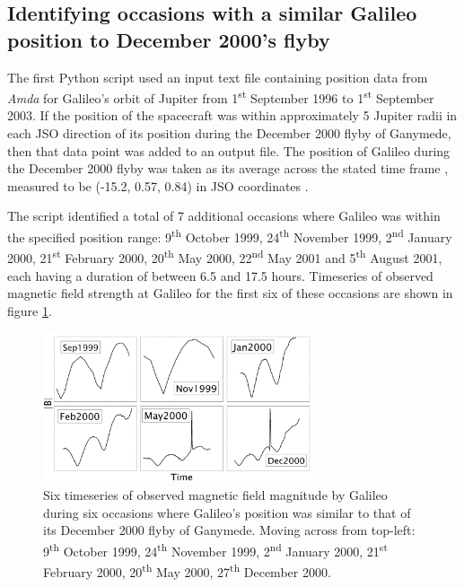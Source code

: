 \documentclass[11pt]{article}
\begin{document}
\subsection{Identifying occasions with a similar Galileo position to December 2000's flyby}
The first Python script used an input text file containing position data from \emph{Amda} for Galileo's orbit of Jupiter from 1\textsuperscript{st} September 1996 to 1\textsuperscript{st} September 2003. If the position of the spacecraft was within approximately 5 Jupiter radii in each JSO direction of its position during the December 2000 flyby of Ganymede, then that data point was added to an output file. The position of Galileo during the December 2000 flyby was taken as its average across the stated time frame \cite{nasaflybys}, measured to be (-15.2, 0.57, 0.84) in JSO coordinates \cite{amda}.

The script identified a total of 7 additional occasions where Galileo was within the specified position range: 9\textsuperscript{th} October 1999, 24\textsuperscript{th} November 1999, 2\textsuperscript{nd} January 2000, 21\textsuperscript{st} February 2000, 20\textsuperscript{th} May 2000, 22\textsuperscript{nd} May 2001 and 5\textsuperscript{th} August 2001, each having a duration of between 6.5 and 17.5 hours. Timeseries of observed magnetic field strength at Galileo for the first six of these occasions are shown in figure \ref{fig:6panelmag}.

\begin{figure}[!htb]
    \centering
    \includegraphics[width=8cm]{6magtimeseries-small.png}
    \captionsetup{width=13cm}
    \caption{Six timeseries of observed magnetic field magnitude by Galileo during six occasions where Galileo's position was similar to that of its December 2000 flyby of Ganymede. Moving across from top-left: 9\textsuperscript{th} October 1999, 24\textsuperscript{th} November 1999, 2\textsuperscript{nd} January 2000, 21\textsuperscript{st} February 2000, 20\textsuperscript{th} May 2000, 27\textsuperscript{th} December 2000.}
    \label{fig:6panelmag}
\end{figure}
\end{document}
